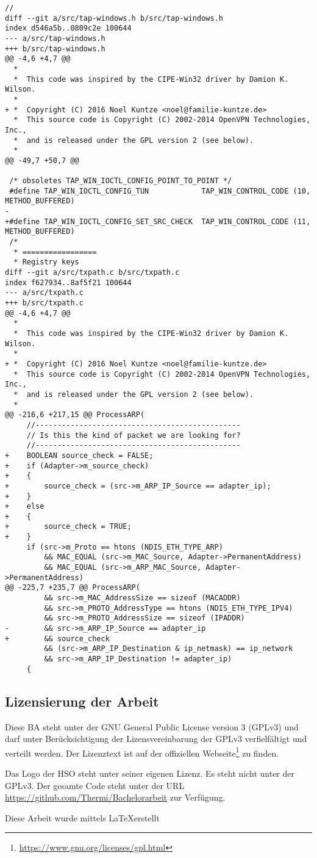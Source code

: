 \begin{center}
\begin{lstlisting}[caption=Patch für TAP-Windows6]
         //
diff --git a/src/tap-windows.h b/src/tap-windows.h
index d546a5b..0809c2e 100644
--- a/src/tap-windows.h
+++ b/src/tap-windows.h
@@ -4,6 +4,7 @@
  *
  *  This code was inspired by the CIPE-Win32 driver by Damion K. Wilson.
  *
+ *  Copyright (C) 2016 Noel Kuntze <noel@familie-kuntze.de>
  *  This source code is Copyright (C) 2002-2014 OpenVPN Technologies, Inc.,
  *  and is released under the GPL version 2 (see below).
  *
@@ -49,7 +50,7 @@
 
 /* obsoletes TAP_WIN_IOCTL_CONFIG_POINT_TO_POINT */
 #define TAP_WIN_IOCTL_CONFIG_TUN            TAP_WIN_CONTROL_CODE (10, METHOD_BUFFERED)
-
+#define TAP_WIN_IOCTL_CONFIG_SET_SRC_CHECK  TAP_WIN_CONTROL_CODE (11, METHOD_BUFFERED)
 /*
  * =================
  * Registry keys
diff --git a/src/txpath.c b/src/txpath.c
index f627934..8af5f21 100644
--- a/src/txpath.c
+++ b/src/txpath.c
@@ -4,6 +4,7 @@
  *
  *  This code was inspired by the CIPE-Win32 driver by Damion K. Wilson.
  * 
+ *  Copyright (C) 2016 Noel Kuntze <noel@familie-kuntze.de>
  *  This source code is Copyright (C) 2002-2014 OpenVPN Technologies, Inc.,
  *  and is released under the GPL version 2 (see below).
  *
@@ -216,6 +217,15 @@ ProcessARP(
     //-----------------------------------------------
     // Is this the kind of packet we are looking for?
     //-----------------------------------------------
+    BOOLEAN source_check = FALSE;
+    if (Adapter->m_source_check)
+    {
+        source_check = (src->m_ARP_IP_Source == adapter_ip);
+    }
+    else
+    {
+        source_check = TRUE;
+    }
     if (src->m_Proto == htons (NDIS_ETH_TYPE_ARP)
         && MAC_EQUAL (src->m_MAC_Source, Adapter->PermanentAddress)
         && MAC_EQUAL (src->m_ARP_MAC_Source, Adapter->PermanentAddress)
@@ -225,7 +235,7 @@ ProcessARP(
         && src->m_MAC_AddressSize == sizeof (MACADDR)
         && src->m_PROTO_AddressType == htons (NDIS_ETH_TYPE_IPV4)
         && src->m_PROTO_AddressSize == sizeof (IPADDR)
-        && src->m_ARP_IP_Source == adapter_ip
+        && source_check
         && (src->m_ARP_IP_Destination & ip_netmask) == ip_network
         && src->m_ARP_IP_Destination != adapter_ip)
     {
\end{lstlisting}
\end{center}

\subsection{Lizensierung der Arbeit}
Diese \ac{BA} steht unter der GNU General Public License version 3 (GPLv3)
und darf unter Berücksichtigung der Lizensvereinbarung der GPLv3 verfielfältigt
und verteilt werden. Der Lizenztext ist auf der offiziellen Webseite\footnote{\url{https://www.gnu.org/licenses/gpl.html}}
zu finden.

Das Logo der \ac{HSO} steht unter seiner eigenen Lizenz. Es steht nicht unter der GPLv3.
Der gesamte Code steht unter der URL \url{https://github.com/Thermi/Bachelorarbeit} zur Verfügung.

\begin{centering} 

Diese Arbeit wurde mittels \LaTeX erstellt
\end{centering}
